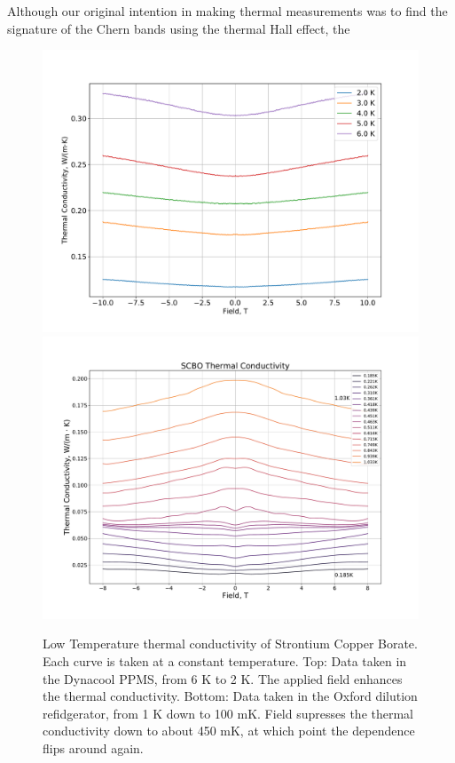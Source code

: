 \documentclass{thesis-umich}
\begin{document}
Although our original intention in making thermal measurements was to find the signature of the Chern bands using the thermal Hall effect, the 
\begin{figure}
	\caption[Low Temperature Thermal Conductivity of SCBO]{Low Temperature thermal conductivity of Strontium Copper Borate. Each curve is taken at a constant temperature. Top: Data taken in the Dynacool PPMS, from 6 K to 2 K. The applied field enhances the thermal conductivity. Bottom: Data taken in the Oxford dilution refidgerator, from 1 K down to 100 mK. Field supresses the thermal conductivity down to about 450 mK, at which point the dependence flips around again.}
	\label{fig:SCBO_kappa_xx}
	\includegraphics[width=\columnwidth]{figures/SCBO_tcond_high.pdf}
	\includegraphics[width=\columnwidth]{figures/SCBO_kappa_xx_vs_B_1.pdf}
\end{figure}
\end{document}
